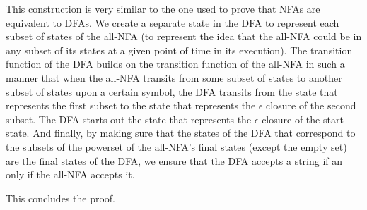 \documentclass{article}
\begin{document}
This construction is very similar to the one used to prove that NFAs are equivalent to DFAs. We create a separate state in the DFA to represent each subset of states of the all-NFA (to represent the idea that the all-NFA could be in any subset of its states at a given point of time in its execution). The transition function of the DFA builds on the transition function of the all-NFA in such a manner that when the all-NFA transits from some subset of states to another subset of states upon a certain symbol, the DFA transits from the state that represents the first subset to the state that represents the $\epsilon$ closure of the second subset. The DFA starts out the state that represents the $\epsilon$ closure of the start state. And finally, by making sure that the states of the DFA that correspond to the subsets of the powerset of the all-NFA's final states (except the empty set) are the final states of the DFA, we ensure that the DFA accepts a string if an only if the all-NFA accepts it.

This concludes the proof.
\end{document}
